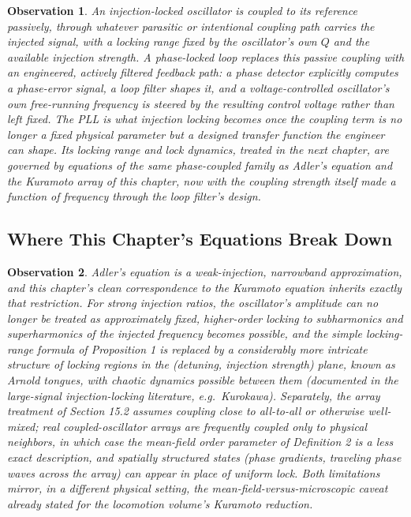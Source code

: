 \documentclass[12pt]{article}
\newtheorem{observation}{Observation}
\begin{document}
\begin{observation}
An injection-locked oscillator is coupled to its reference passively, through whatever parasitic or intentional coupling path carries the injected signal, with a locking range fixed by the oscillator's own $Q$ and the available injection strength. A phase-locked loop replaces this passive coupling with an engineered, actively filtered feedback path: a phase detector explicitly computes a phase-error signal, a loop filter shapes it, and a voltage-controlled oscillator's own free-running frequency is steered by the resulting control voltage rather than left fixed. The PLL is what injection locking becomes once the coupling term is no longer a fixed physical parameter but a designed transfer function the engineer can shape. Its locking range and lock dynamics, treated in the next chapter, are governed by equations of the same phase-coupled family as Adler's equation and the Kuramoto array of this chapter, now with the coupling strength itself made a function of frequency through the loop filter's design.
\end{observation}

\subsection*{Where This Chapter's Equations Break Down}

\begin{observation}
Adler's equation is a weak-injection, narrowband approximation, and this chapter's clean correspondence to the Kuramoto equation inherits exactly that restriction. For strong injection ratios, the oscillator's amplitude can no longer be treated as approximately fixed, higher-order locking to subharmonics and superharmonics of the injected frequency becomes possible, and the simple locking-range formula of Proposition 1 is replaced by a considerably more intricate structure of locking regions in the (detuning, injection strength) plane, known as Arnold tongues, with chaotic dynamics possible between them (documented in the large-signal injection-locking literature, e.g.\ Kurokawa). Separately, the array treatment of Section 15.2 assumes coupling close to all-to-all or otherwise well-mixed; real coupled-oscillator arrays are frequently coupled only to physical neighbors, in which case the mean-field order parameter of Definition 2 is a less exact description, and spatially structured states (phase gradients, traveling phase waves across the array) can appear in place of uniform lock. Both limitations mirror, in a different physical setting, the mean-field-versus-microscopic caveat already stated for the locomotion volume's Kuramoto reduction.
\end{observation}
\end{document}

